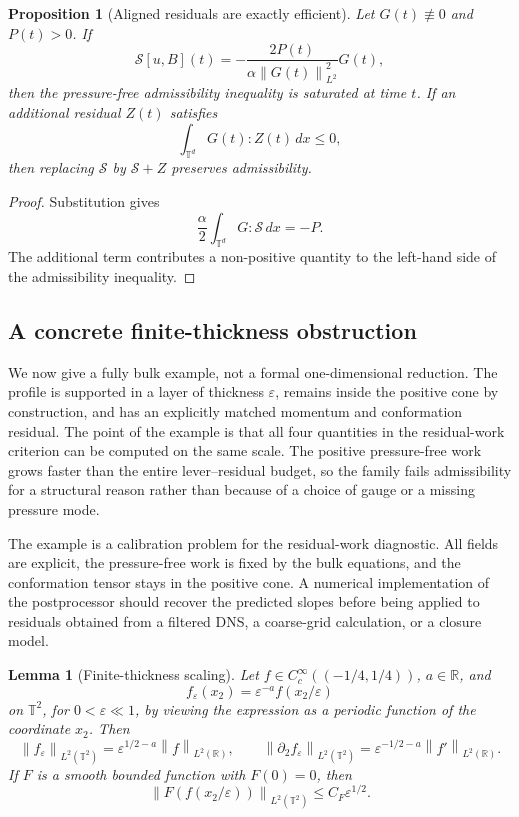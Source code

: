 \documentclass[11pt]{article}
\numberwithin{equation}{section}
\newtheorem{proposition}[theorem]{Proposition}
\newtheorem{lemma}[theorem]{Lemma}
\newcommand{\T}{\mathbb T}
\newcommand{\R}{\mathbb R}
\newcommand{\eps}{\varepsilon}
\newcommand{\norm}[1]{\left\lVert #1\right\rVert}
\begin{document}
\begin{proposition}[Aligned residuals are exactly efficient]
\label{prop:aligned-example}
Let \(G(t)\not\equiv0\) and \(P(t)>0\).  If
\[
  \mathcal S[u,B](t)
  =
  -\frac{2P(t)}{\alpha\norm{G(t)}_{L^2}^2}G(t),
\]
then the pressure-free admissibility inequality is saturated at time \(t\).
If an additional residual \(Z(t)\) satisfies
\[
  \int_{\T^d}G(t):Z(t)\,dx\le0,
\]
then replacing \(\mathcal S\) by \(\mathcal S+Z\) preserves admissibility.
\end{proposition}

\begin{proof}
Substitution gives
\[
  \frac{\alpha}{2}\int_{\T^d}G:\mathcal S\,dx=-P.
\]
The additional term contributes a non-positive quantity to the left-hand side
of the admissibility inequality.
\end{proof}

\subsection{A concrete finite-thickness obstruction}

We now give a fully bulk example, not a formal one-dimensional reduction.  The
profile is supported in a layer of thickness \(\eps\), remains inside the
positive cone by construction, and has an explicitly matched momentum and
conformation residual.  The point of the example is that all four quantities
in the residual-work criterion can be computed on the same scale.  The positive
pressure-free work grows faster than the entire lever--residual budget, so the
family fails admissibility for a structural reason rather than because of a
choice of gauge or a missing pressure mode.

The example is a calibration problem for the residual-work diagnostic.  All
fields are explicit, the pressure-free work is fixed by the bulk equations, and
the conformation tensor stays in the positive cone.  A numerical implementation
of the postprocessor should recover the predicted slopes before being applied
to residuals obtained from a filtered DNS, a coarse-grid calculation, or a
closure model.

\begin{lemma}[Finite-thickness scaling]
\label{lem:finite-thickness-scaling}
Let \(f\in C_c^\infty((-1/4,1/4))\), \(a\in\R\), and
\[
  f_\eps(x_2)=\eps^{-a}f(x_2/\eps)
\]
on \(\T^2\), for \(0<\eps\ll1\), by viewing the expression as a periodic
function of the coordinate \(x_2\).  Then
\[
  \norm{f_\eps}_{L^2(\T^2)}
  =
  \eps^{1/2-a}\norm{f}_{L^2(\R)},
  \qquad
  \norm{\partial_2 f_\eps}_{L^2(\T^2)}
  =
  \eps^{-1/2-a}\norm{f'}_{L^2(\R)}.
  \label{eq:finite-thickness-scale}
\]
If \(F\) is a smooth bounded function with \(F(0)=0\), then
\[
  \norm{F(f(x_2/\eps))}_{L^2(\T^2)}
  \le C_F\eps^{1/2}.
  \label{eq:bounded-layer-scale}
\]
\end{lemma}
\end{document}
